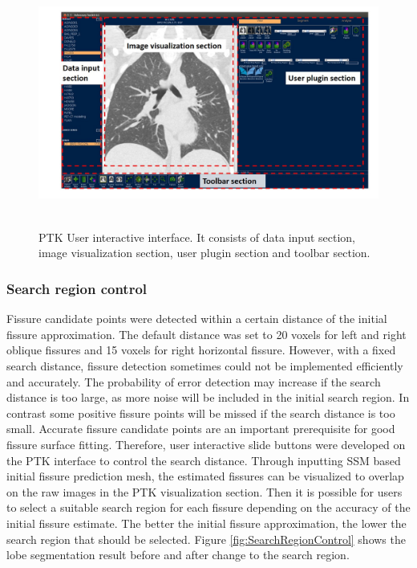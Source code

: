 {\begin{figure}[htbp]
  \flushleft 
  \includegraphics[height=3.2in]{Segmentation/Image/PTKUserInterface.jpg}
  \caption{PTK User interactive interface. It consists of data input section, image visualization section, user plugin section and toolbar section.}
  \label{fig:PTKUserInterface}
\end{figure}

\subsubsection{Search region control}
Fissure candidate points were detected within a certain distance of the initial fissure approximation. The default distance was set to 20 voxels for left and right oblique fissures and 15 voxels for right horizontal fissure. However, with a fixed search distance, fissure detection sometimes could not be implemented efficiently and accurately. The probability of error detection may increase if the search distance is too large, as more noise will be included in the initial search region. In contrast some positive fissure points will be missed if the search distance is too small. Accurate fissure candidate points are an important prerequisite for good fissure surface fitting. Therefore, user interactive slide buttons were developed on the PTK interface to control the search distance. Through inputting SSM based initial fissure prediction mesh, the estimated fissures can be  visualized to overlap on the raw images in the PTK visualization section. Then it is possible for users to select a suitable search region for each fissure depending on the accuracy of the initial fissure estimate. The better the initial fissure approximation, the lower the search region that should be selected. Figure \ref{fig:SearchRegionControl} shows the lobe segmentation result before and after change to the search region.
\newpage

}
